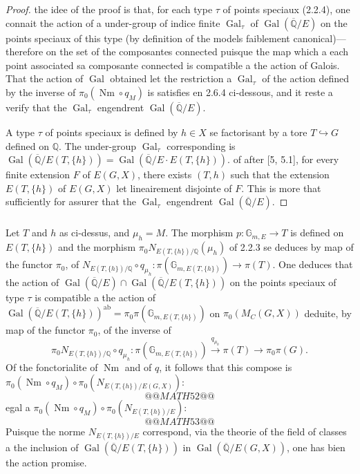 \documentclass[12pt,a4paper]{article}
\theoremstyle{plain}
\theoremstyle{definition}
\theoremstyle{remark}
\DeclareMathOperator{\Gal}{Gal}
\DeclareMathOperator{\Nm}{Nm}
\newcommand{\QQ}{\mathbb{Q}}
\newcommand{\Gm}{\mathbb{G}}
\begin{document}
\begin{proof}
the idee of the proof is that, for each type $\tau$ of points speciaux (2.2.4), one connait the action of a under-group of indice finite $\Gal_\tau$ of $\Gal(\overline{\QQ}/E)$ on the points speciaux of this type (by definition of the models faiblement canonical)---therefore on the set of the composantes connected puisque the map which a each point associated sa composante connected is compatible a the action of Galois. That the action of $\Gal$ obtained let the restriction a $\Gal_\tau$ of the action defined by the inverse of $\pi_0(\Nm \circ q_M)$ is satisfies en 2.6.4 ci-dessous, and it reste a verify that the $\Gal_\tau$ engendrent $\Gal(\overline{\QQ}/E)$.

A type $\tau$ of points speciaux is defined by $h \in X$ se factorisant by a tore $T \hookrightarrow G$ defined on $\QQ$. The under-group $\Gal_\tau$ corresponding is $\Gal(\overline{\QQ}/E(T,\{h\})) = \Gal(\overline{\QQ}/E \cdot E(T,\{h\}))$. of after [5, 5.1], for every finite extension $F$ of $E(G,X)$, there exists $(T,h)$ such that the extension $E(T,\{h\})$ of $E(G,X)$ let lineairement disjointe of $F$. This is more that sufficiently for assurer that the $\Gal_\tau$ engendrent $\Gal(\overline{\QQ}/E)$.
\end{proof}

\subsubsection{}

Let $T$ and $h$ as ci-dessus, and $\mu_h = M$. The morphism $p:\Gm_{m,E} \to T$ is defined on $E(T,\{h\})$ and the morphism $\pi_0 N_{E(T,\{h\})/\QQ}(\mu_h)$ of 2.2.3 se deduces by map of the functor $\pi_0$, of $N_{E(T,\{h\})/\QQ} \circ q_{\mu_h}: \pi(\Gm_{m,E(T,\{h\})}) \to \pi(T)$. One deduces that the action of $\Gal(\overline{\QQ}/E) \cap \Gal(\overline{\QQ}/E(T,\{h\}))$ on the points speciaux of type $\tau$ is compatible a the action of $\Gal(\overline{\QQ}/E(T,\{h\}))^{\text{ab}} = \pi_0\pi(\Gm_{m,E(T,\{h\})})$ on $\pi_0(M_C(G,X))$ deduite, by map of the functor $\pi_0$, of the inverse of
\[
\pi_0 N_{E(T,\{h\})/\QQ} \circ q_{\mu_h}: \pi(\Gm_{m,E(T,\{h\})}) \xrightarrow{q_{\mu_h}} \pi(T) \to \pi_0\pi(G).
\]
Of the fonctorialite of $\Nm$ and of $q$, it follows that this compose is $\pi_0(\Nm \circ q_M) \circ \pi_0(N_{E(T,\{h\})/E(G,X)})$:
\[
@@MATH52@@
\]
egal a $\pi_0(\Nm \circ q_M) \circ \pi_0(N_{E(T,\{h\})/E})$:
\[
@@MATH53@@
\]
Puisque the norme $N_{E(T,\{h\})/E}$ correspond, via the theorie of the field of classes a the inclusion of $\Gal(\overline{\QQ}/E(T,\{h\}))$ in $\Gal(\overline{\QQ}/E(G,X))$, one has bien the action promise.
\end{document}
